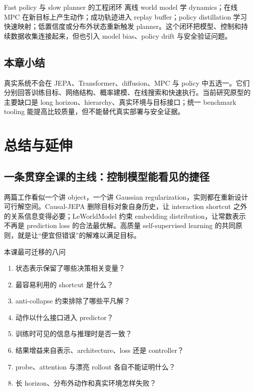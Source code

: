 \documentclass[a4paper]{article}
\begin{document}

\begin{importantbox}{Fast policy 与 slow planner 的工程闭环}
离线 world model 学 dynamics；在线 MPC 在新目标上产生动作；成功轨迹进入 replay buffer；policy distillation 学习快速映射；低置信度或分布外状态重新触发 planner。这个闭环把模型、控制和持续数据收集连接起来，但也引入 model bias、policy drift 与安全验证问题。
\end{importantbox}

\subsection{本章小结}

真实系统不会在 JEPA、Transformer、diffusion、MPC 与 policy 中五选一。它们分别回答训练目标、网络结构、概率建模、在线搜索和快速执行。当前研究原型的主要缺口是 long horizon、hierarchy、真实环境与目标接口；统一 benchmark tooling 能提高比较质量，但不能替代真实部署与安全证据。

\section{总结与延伸}

\subsection{一条贯穿全课的主线：控制模型能看见的捷径}

两篇工作看似一个讲 object，一个讲 Gaussian regularization，实则都在重新设计可行解空间。Causal-JEPA 删除目标对象自身历史，让 interaction shortcut 之外的关系信息变得必要；LeWorldModel 约束 embedding distribution，让常数表示不再是 prediction loss 的合法最优解。高质量 self-supervised learning 的共同原则，就是让``便宜但错误''的解难以满足目标。

\begin{importantbox}{本课最可迁移的八问}
\begin{enumerate}
  \item 状态表示保留了哪些决策相关变量？
  \item 最容易利用的 shortcut 是什么？
  \item anti-collapse 约束排除了哪些平凡解？
  \item 动作以什么接口进入 predictor？
  \item 训练时可见的信息与推理时是否一致？
  \item 结果增益来自表示、architecture、loss 还是 controller？
  \item probe、attention 与漂亮 rollout 各自不能证明什么？
  \item 长 horizon、分布外动作和真实环境怎样失败？
\end{enumerate}
\end{importantbox}
\end{document}
